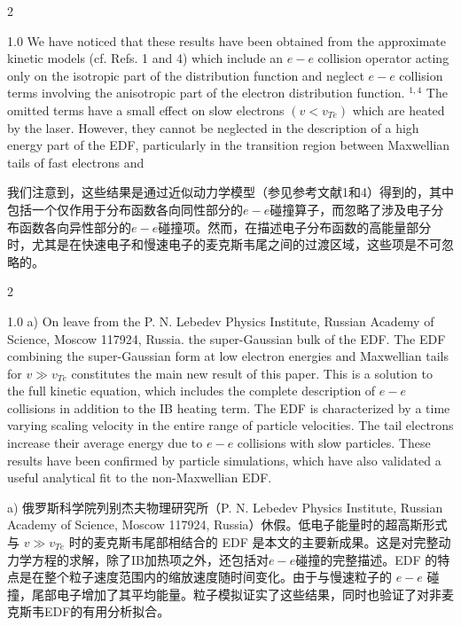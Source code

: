 \documentclass[oneside,onecolumn]{article}
\newcommand\enzhbox[2]{
  	\quad\par \begin{paracol}{2} \colseprulecolor{black} 
  			\begin{spacing}{1.0}
  				\footnotesize  #1
  			\end{spacing}
  		\switchcolumn[1] 
  		#2
  	\end{paracol} 
  }
\begin{document}
\begin{sloppypar}
 
\enzhbox{   We have noticed that these results have been obtained from the approximate kinetic models (cf. Refs. 1 and 4) which include an $e-e$ collision operator acting only on the isotropic part of the distribution function and neglect $e-e$ collision terms involving the anisotropic part of the electron distribution function. ${ }^{1,4}$ The omitted terms have a small effect on slow electrons $\left(v<v_{T e}\right)$ which are heated by the laser. However, they cannot be neglected in the description of a high energy part of the EDF, particularly in the transition region between Maxwellian tails of fast electrons and
}{
我们注意到，这些结果是通过近似动力学模型（参见参考文献1和4）得到的，其中包括一个仅作用于分布函数各向同性部分的$e-e$碰撞算子，而忽略了涉及电子分布函数各向异性部分的$e-e$碰撞项。然而，在描述电子分布函数的高能量部分时，尤其是在快速电子和慢速电子的麦克斯韦尾之间的过渡区域，这些项是不可忽略的。

}
  
 
\enzhbox{   a) On leave from the P. N. Lebedev Physics Institute, Russian Academy of Science, Moscow 117924, Russia. the super-Gaussian bulk of the EDF. The EDF combining the super-Gaussian form at low electron energies and Maxwellian tails for $v \gg v_{T e}$ constitutes the main new result of this paper. This is a solution to the full kinetic equation, which includes the complete description of $e-e$ collisions in addition to the IB heating term. The EDF is characterized by a time varying scaling velocity in the entire range of particle velocities. The tail electrons increase their average energy due to $e-e$ collisions with slow particles. These results have been confirmed by particle simulations, which have also validated a useful analytical fit to the non-Maxwellian EDF.
}{
a) 俄罗斯科学院列别杰夫物理研究所（P. N. Lebedev Physics Institute, Russian Academy of Science, Moscow 117924, Russia）休假。低电子能量时的超高斯形式与 $v \gg v_{T e}$ 时的麦克斯韦尾部相结合的 EDF 是本文的主要新成果。这是对完整动力学方程的求解，除了IB加热项之外，还包括对$e-e$碰撞的完整描述。EDF 的特点是在整个粒子速度范围内的缩放速度随时间变化。由于与慢速粒子的 $e-e$ 碰撞，尾部电子增加了其平均能量。粒子模拟证实了这些结果，同时也验证了对非麦克斯韦EDF的有用分析拟合。

}
  

\end{sloppypar}
\end{document}
